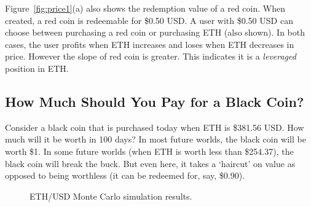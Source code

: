 Figure~\ref{fig:price1}(a) also shows the redemption value of a red coin. When created, a red coin is redeemable for \$0.50 USD. A user with \$0.50 USD can choose between purchasing a red coin or purchasing ETH (also shown). In both cases, the user profits when ETH increases and loses when ETH decreases in price. However the slope of red coin is greater. This indicates it is a \emph{leveraged} position in ETH.  


\subsection{How Much Should You Pay for a Black Coin?}

Consider a black coin that is purchased today when ETH is \$381.56 USD. How much will it be worth in 100 days? In most future worlds, the black coin will be worth \$1. In some future worlds (when ETH is worth less than \$254.37), the black coin will break the buck. But even here, it takes a `haircut' on value as opposed to being worthless (\eg it can be redeemed for, say, \$0.90). 

\begin{figure}[t]
    \centering
        \qquad
    \caption[Monte Carlo Simulation Results]{ETH/USD Monte Carlo simulation results. \label{fig:sim}}
\end{figure}

